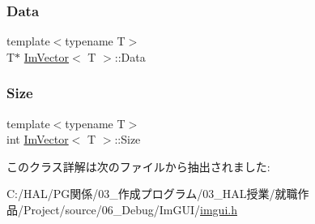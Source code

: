 \mbox{\label{class_im_vector_ac0e46e8b30cb079d93c8f0aad7d7cbd0}} 
\subsubsection{\texorpdfstring{Data}{Data}}
{\footnotesize\ttfamily template$<$typename T$>$ \\
T$\ast$ \mbox{\hyperlink{class_im_vector}{Im\+Vector}}$<$ T $>$\+::Data}

\mbox{\label{class_im_vector_abbfd157947f66280d27b21d70a16df8d}} 
\subsubsection{\texorpdfstring{Size}{Size}}
{\footnotesize\ttfamily template$<$typename T$>$ \\
int \mbox{\hyperlink{class_im_vector}{Im\+Vector}}$<$ T $>$\+::Size}



このクラス詳解は次のファイルから抽出されました\+:\begin{DoxyCompactItemize}
\item 
C\+:/\+H\+A\+L/\+P\+G関係/03\+\_\+作成プログラム/03\+\_\+\+H\+A\+L授業/就職作品/\+Project/source/06\+\_\+\+Debug/\+Im\+G\+U\+I/\mbox{\hyperlink{imgui_8h}{imgui.\+h}}\end{DoxyCompactItemize}

